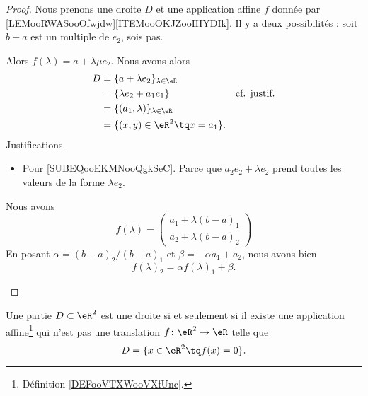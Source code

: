 \begin{proof}
	Nous prenons une droite \( D\) et une application affine \( f\) donnée par \eqref{LEMooRWASooOfwjdw}\ref{ITEMooOKJZooIHYDIk}. Il y a deux possibilités : soit \( b-a\) est un multiple de \( e_2\), sois pas.
	\begin{subproof}
		\spitem[Si \( b-a=\mu e_2\)]
		Alors \( f(\lambda)=a+\lambda\mu e_2\). Nous avons alors
		\begin{subequations}
			\begin{align}
				D & =\{ a+\lambda e_2 \}_{\lambda\in \eR}                                                  \\
				  & =	\{ \lambda e_2+a_1e_1 \}              & \text{cf. justif.}		\label{SUBEQooEKMNooQgkSeC} \\
				  & = \{ (a_1,\lambda) \}_{\lambda\in \eR}                                                 \\\
				  & =\{ (x,y)\in \eR^2\tq x=a_1 \}.
			\end{align}
		\end{subequations}
		Justifications.
		\begin{itemize}
			\item
			      Pour \ref{SUBEQooEKMNooQgkSeC}. Parce que \( a_2e_2+\lambda e_2\) prend toutes les valeurs de la forme \( \lambda e_2\).
		\end{itemize}
		\spitem[Sinon]
		Nous avons
		\begin{equation}
			f(\lambda)=\begin{pmatrix}
				a_1+\lambda(b-a)_1 \\
				a_2+\lambda(b-a)_2
			\end{pmatrix}
		\end{equation}
		En posant \( \alpha=(b-a)_2/(b-a)_1\) et \( \beta=-\alpha a_1+a_2\), nous avons bien
		\begin{equation}
			f(\lambda)_2=\alpha f(\lambda)_1+\beta.
		\end{equation}
	\end{subproof}
\end{proof}

\begin{proposition}     \label{PROPooOFKXooARiQZK}
	Une partie \( D\subset \eR^2\) est une droite si et seulement si il existe une application affine\footnote{Définition \ref{DEFooVTXWooVXfUnc}.} qui n'est pas une translation \( f\colon \eR^2\to \eR\) telle que
	\begin{equation}
		D=\{ x\in \eR^2\tq f(x)=0 \}.
	\end{equation}
\end{proposition}

